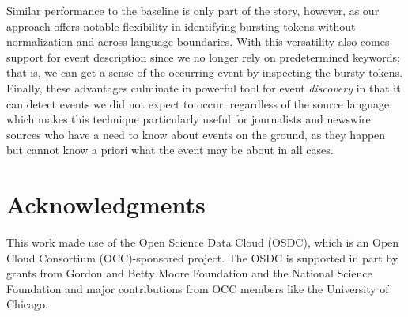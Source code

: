 \documentclass{sig-alternate}
\begin{document}
Similar performance to the baseline is only part of the story, however, as our approach offers notable flexibility in identifying bursting tokens without normalization and across language boundaries.
With this versatility also comes support for event description since we no longer rely on predetermined keywords; that is, we can get a sense of the occurring event by inspecting the bursty tokens.
Finally, these advantages culminate in powerful tool for event \emph{discovery} in that it can detect events we did not expect to occur, regardless of the source language, which makes this technique particularly useful for journalists and newswire sources who have a need to know about events on the ground, as they happen but cannot know a priori what the event may be about in all cases.


\section{Acknowledgments}
This work made use of the Open Science Data Cloud (OSDC), which is an Open Cloud Consortium (OCC)-sponsored project. 
The OSDC is supported in part by grants from Gordon and Betty Moore Foundation and the National Science Foundation and major contributions from OCC members like the University of Chicago. 

%

%
%
\end{document}
